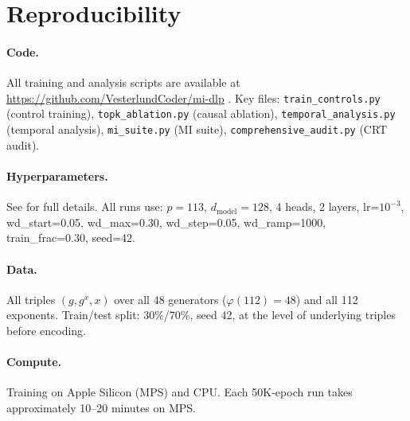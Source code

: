 \documentclass[11pt,a4paper]{article}
\theoremstyle{definition}
\theoremstyle{remark}
\begin{document}
\section{Reproducibility}

\paragraph{Code.} All training and analysis scripts are available at \url{https://github.com/VesterlundCoder/mi-dlp} \citep{vesterlund2026mi_dlp_repo}. Key files: \texttt{train\_controls.py} (control training), \texttt{topk\_ablation.py} (causal ablation), \texttt{temporal\_analysis.py} (temporal analysis), \texttt{mi\_suite.py} (MI suite), \texttt{comprehensive\_audit.py} (CRT audit).

\paragraph{Hyperparameters.} See  for full details. All runs use: $p=113$, $d_{\mathrm{model}}=128$, 4 heads, 2 layers, lr=$10^{-3}$, wd\_start=0.05, wd\_max=0.30, wd\_step=0.05, wd\_ramp=1000, train\_frac=0.30, seed=42.

\paragraph{Data.} All triples $(g, g^x, x)$ over all 48 generators ($\varphi(112)=48$) and all 112 exponents. Train/test split: 30\%/70\%, seed 42, at the level of underlying triples before encoding.

\paragraph{Compute.} Training on Apple Silicon (MPS) and CPU. Each 50K-epoch run takes approximately 10--20 minutes on MPS.
\end{document}
